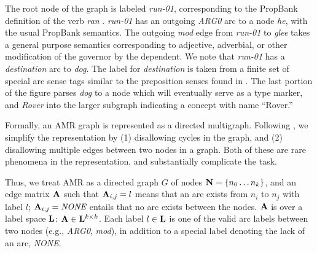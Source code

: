 \documentclass[11pt]{article}
\newcommand\w[1]{\textit{#1}} %
\newcommand\e[1]{\textit{#1}} %
\newcommand\n[1]{\textit{#1}} %
\begin{document}
The root node of the graph is labeled \n{run-01}, corresponding to the PropBank \cite{Palmer:2005} definition of the verb \w{ran} .
\w{run-01} has an outgoing \e{ARG0} arc to a node \w{he}, with the usual PropBank semantics.
The outgoing \e{mod} edge from \n{run-01} to \n{glee} takes a general purpose semantics corresponding to adjective, adverbial, or other modification of the governor by the dependent.
We note that \n{run-01} has a \e{destination} arc to \n{dog}.
The label for \e{destination} is taken from a finite set of special arc sense tags similar to the preposition senses found in \cite{Srikumar:2013}.
The last portion of the figure parses \w{dog} to a node which will eventually serve as a type marker, and \w{Rover} into the larger subgraph indicating a concept with name ``Rover.''


Formally, an AMR graph is represented as a directed multigraph.
Following , we simplify the representation by (1) disallowing
  cycles in the graph, and (2) disallowing multiple edges between two nodes in a
  graph.
Both of these are rare phenomena in the representation, and substantially complicate
  the task.

Thus, we treat AMR as a directed graph $G$ of nodes $\mathbf{N} = \{n_0 \dots n_k\}$, and
  an edge matrix $\mathbf{A}$ such that $\mathbf{A}_{i,j} = l$ means that an arc exists from $n_i$ to $n_j$ with label $l$;
  $\bA_{i,j} = \e{NONE}$ entails that no arc exists between the nodes.
  $\mathbf{A}$ is over a label space $\mathbf{L}$: $\mathbf{A} \in \mathbf{L}^{k \times k}$.
Each label $l \in \mathbf{L}$ is one of the valid arc labels between two nodes (e.g.,
  \e{ARG0}, \e{mod}), in addition to a special label denoting the lack of an arc, \e{NONE}.

\end{document}
